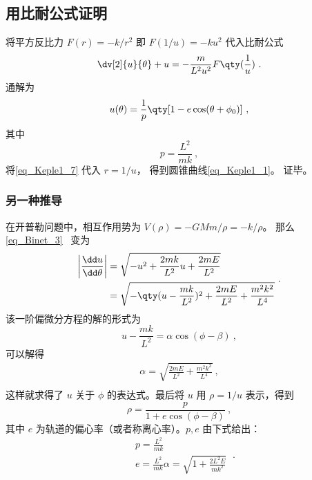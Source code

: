 \subsection{用比耐公式证明}

将平方反比力 $F(r) = -k/r^2$ 即 $F(1/u) = -ku^2$ 代入比耐公式
\begin{equation}
\dv[2]{u}{\theta} + u = -\frac{m}{L^2 u^2} F\qty(\frac 1u)~.
\end{equation}
通解为
\begin{equation}\label{eq_Keple1_7}
u(\theta) = \frac{1}{p} \qty[1 - e\cos(\theta  + \phi_0)]~,
\end{equation}
其中
\begin{equation}
p = \frac{L^2}{mk}~,
\end{equation}
将\autoref{eq_Keple1_7} 代入 $r = 1/u$， 得到圆锥曲线\autoref{eq_Keple1_1}。 证毕。

\subsubsection{另一种推导}
在开普勒问题中，相互作用势为 $V(\rho)=-GMm/\rho=-k/\rho$。 那么 \autoref{eq_Binet_3}~ 变为
\begin{equation}
\begin{aligned}
\left|\frac{\dd u}{\dd \theta}\right|&=\sqrt{-u^2+\frac{2m k}{L^2}u+\frac{2m E}{L^2}}\\
&=\sqrt{-\qty(u-\frac{m k}{L^2})^2+\frac{2m E}{L^2}+\frac{m^2 k^2}{L^4}}
\end{aligned}~.
\end{equation}
该一阶偏微分方程的解的形式为
\begin{equation}
u-\frac{m k}{L^2}=\alpha\cos(\phi-\beta)~,
\end{equation}
可以解得
\begin{equation}
\begin{aligned}
\alpha=\sqrt{\frac{2m E}{L^2}+\frac{m^2 k^2}{L^4}}~,\\
\end{aligned}
\end{equation}
这样就求得了 $u$ 关于 $\phi$ 的表达式。最后将 $u$ 用 $\rho=1/u$ 表示，得到
\begin{equation}
\rho=\frac{p}{1+e\cos(\phi-\beta)}~,
\end{equation}
其中 $e$ 为轨道的偏心率（或者称离心率）。$p,e$ 由下式给出：
\begin{equation}
\begin{aligned}
&p=\frac{L^2}{m k}\\
&e=\frac{L^2}{m k}\alpha=\sqrt{1+\frac{2L^2E}{m k^2}}
\end{aligned}~.
\end{equation}

